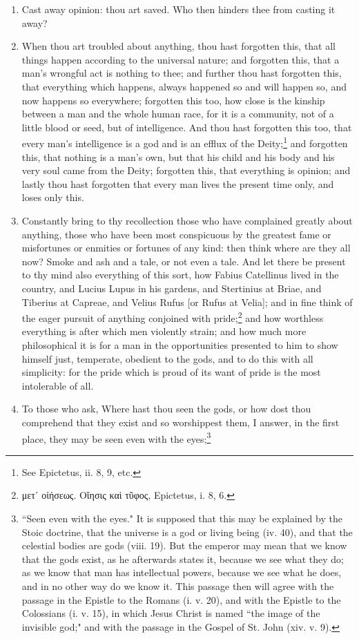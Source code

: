 \begin{enumerate}
\item Cast away opinion: thou art saved. Who then hinders thee from casting it away?

\item When thou art troubled about anything, thou hast forgotten this, that all things happen according to the universal nature; and forgotten this, that a man's wrongful act is nothing to thee; and further thou hast forgotten this, that everything which happens, always happened so and will happen so, and now happens so everywhere; forgotten this too, how close is the kinship between a man and the whole human race, for it is a community, not of a little blood or seed, but of intelligence. And thou hast forgotten this too, that every man's intelligence is a god and is an efflux of the Deity;\footnote{See Epictetus, ii. 8, 9, etc.} and forgotten this, that nothing is a man's own, but that his child and his body and his very soul came from the Deity; forgotten this, that everything is opinion; and lastly thou hast forgotten that every man lives the present time only, and loses only this.

\item Constantly bring to thy recollection those who have complained greatly about anything, those who have been most conspicuous by the greatest fame or misfortunes or enmities or fortunes of any kind: then think where are they all now? Smoke and ash and a tale, or not even a tale. And let there be present to thy mind also everything of this sort, how Fabius Catellinus lived in the country, and Lucius Lupus in his gardens, and Stertinius at Briae, and Tiberius at Capreae, and Velius Rufus [{\clarify or Rufus at Velia}]; and in fine think of the eager pursuit of anything conjoined with pride;\footnote{\textgreek{μετ᾽ οἰήσεως. Οἴησις καὶ τῦφος}, Epictetus, i. 8, 6.} and how worthless everything is after which men violently strain; and how much more philosophical it is for a man in the opportunities presented to him to show himself just, temperate, obedient to the gods, and to do this with all simplicity: for the pride which is proud of its want of pride is the most intolerable of all.

\item To those who ask, Where hast thou seen the gods, or how dost thou comprehend that they exist and so worshippest them, I answer, in the first place, they may be seen even with the eyes;\footnote{``Seen even with the eyes." It is supposed that this may be explained by the Stoic doctrine, that the universe is a god or living being (iv. 40), and that the celestial bodies are gods (viii. 19). But the emperor may mean that we know that the gods exist, as he afterwards states it, because we see what they do; as we know that man has intellectual powers, because we see what he does, and in no other way do we know it. This passage then will agree with the passage in the Epistle to the Romans (i. v. 20), and with the Epistle to the Colossians (i. v. 15), in which Jesus Christ is named ``the image of the invisible god;" and with the passage in the Gospel of St. John (xiv. v. 9).

}
\end{enumerate}
